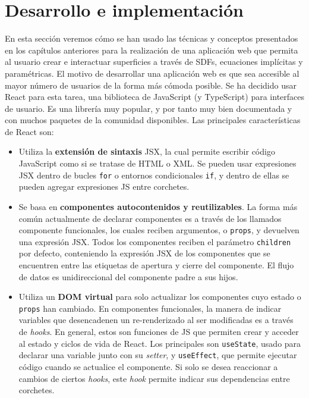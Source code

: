 \chapter{Desarrollo e implementación}
En esta sección veremos cómo se han usado las técnicas y conceptos presentados en los capítulos anteriores para la realización de una aplicación web que permita al usuario crear e interactuar superficies a través de SDFs, ecuaciones implícitas y paramétricas. El motivo de desarrollar una aplicación web es que sea accesible al mayor número de usuarios de la forma más cómoda posible. Se ha decidido usar React \cite{react} para esta tarea, una biblioteca de JavaScript (y TypeScript) para interfaces de usuario. Es una librería muy popular, y por tanto muy bien documentada y con muchos paquetes de la comunidad disponibles. Las principales características de React son:
\begin{itemize}
    \item Utiliza la \textbf{extensión de sintaxis} JSX, la cual permite escribir código JavaScript como si se tratase de HTML o XML. Se pueden usar expresiones JSX dentro de bucles \texttt{for} o entornos condicionales \texttt{if}, y dentro de ellas se pueden agregar expresiones JS entre corchetes. 
    \item Se basa en \textbf{componentes autocontenidos y reutilizables}. La forma más común actualmente de declarar componentes es a través de los llamados componente funcionales, los cuales reciben argumentos, o \texttt{props}, y devuelven una expresión JSX. Todos los componentes reciben el parámetro \texttt{children} por defecto, conteniendo la expresión JSX de los componentes que se encuentren entre las etiquetas de apertura y cierre del componente. El flujo de datos es unidireccional del componente padre a sus hijos.
    \item Utiliza un \textbf{DOM virtual} para solo actualizar los componentes cuyo estado o \texttt{props} han cambiado. En componentes funcionales, la manera de indicar variables que desencadenen un re-renderizado al ser modificadas es a través de \textit{hooks}. En general, estos son funciones de JS que permiten crear y acceder al estado y ciclos de vida de React. Los principales son \texttt{useState}, usado para declarar una variable junto con su \textit{setter}, y \texttt{useEffect}, que permite ejecutar código cuando se actualice el componente. Si solo se desea reaccionar a cambios de ciertos \textit{hooks}, este \textit{hook} permite indicar sus dependencias entre corchetes.
\end{itemize}
